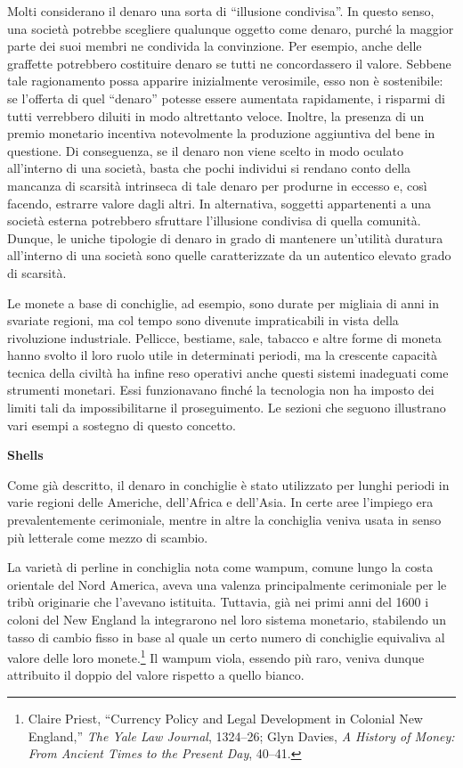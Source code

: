 \documentclass[
  a5paper,
  smalldemyvopaper,10pt,twoside,onecolumn,openright,extrafontsizes,hidelinks]{memoir}
\begin{document}
Molti considerano il denaro una sorta di ``illusione condivisa''. In
questo senso, una società potrebbe scegliere qualunque oggetto come
denaro, purché la maggior parte dei suoi membri ne condivida la
convinzione. Per esempio, anche delle graffette potrebbero costituire
denaro se tutti ne concordassero il valore. Sebbene tale ragionamento
possa apparire inizialmente verosimile, esso non è sostenibile: se
l'offerta di quel ``denaro'' potesse essere aumentata rapidamente, i
risparmi di tutti verrebbero diluiti in modo altrettanto veloce.
Inoltre, la presenza di un premio monetario incentiva notevolmente la
produzione aggiuntiva del bene in questione. Di conseguenza, se il
denaro non viene scelto in modo oculato all'interno di una società,
basta che pochi individui si rendano conto della mancanza di scarsità
intrinseca di tale denaro per produrne in eccesso e, così facendo,
estrarre valore dagli altri. In alternativa, soggetti appartenenti a una
società esterna potrebbero sfruttare l'illusione condivisa di quella
comunità. Dunque, le uniche tipologie di denaro in grado di mantenere
un'utilità duratura all'interno di una società sono quelle
caratterizzate da un autentico elevato grado di scarsità.

Le monete a base di conchiglie, ad esempio, sono durate per migliaia di
anni in svariate regioni, ma col tempo sono divenute impraticabili in
vista della rivoluzione industriale. Pellicce, bestiame, sale, tabacco e
altre forme di moneta hanno svolto il loro ruolo utile in determinati
periodi, ma la crescente capacità tecnica della civiltà ha infine reso
operativi anche questi sistemi inadeguati come strumenti monetari. Essi
funzionavano finché la tecnologia non ha imposto dei limiti tali da
impossibilitarne il proseguimento. Le sezioni che seguono illustrano
vari esempi a sostegno di questo concetto.

\textbf{Shells}

Come già descritto, il denaro in conchiglie è stato utilizzato per
lunghi periodi in varie regioni delle Americhe, dell'Africa e dell'Asia.
In certe aree l'impiego era prevalentemente cerimoniale, mentre in altre
la conchiglia veniva usata in senso più letterale come mezzo di scambio.

La varietà di perline in conchiglia nota come wampum, comune lungo la
costa orientale del Nord America, aveva una valenza principalmente
cerimoniale per le tribù originarie che l'avevano istituita. Tuttavia,
già nei primi anni del 1600 i coloni del New England la integrarono nel
loro sistema monetario, stabilendo un tasso di cambio fisso in base al
quale un certo numero di conchiglie equivaliva al valore delle loro
monete.\footnote{Claire Priest, ``Currency Policy and Legal Development
  in Colonial New England,'' \emph{The Yale Law Journal}, 1324--26; Glyn
  Davies, \emph{A History of Money: From Ancient Times to the Present
  Day}, 40--41.} Il wampum viola, essendo più raro, veniva dunque
attribuito il doppio del valore rispetto a quello bianco.
\end{document}
